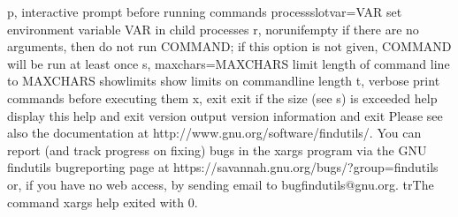 \documentclass[letterpaper,12pt,english]{sphinxmanual}
\begin{document}
\begin{sphinxVerbatim}[commandchars=\\\{\}]
  \PYGZhy{}p, \PYGZhy{}\PYGZhy{}interactive            prompt before running commands
      \PYGZhy{}\PYGZhy{}process\PYGZhy{}slot\PYGZhy{}var=VAR   set environment variable VAR in child processes
  \PYGZhy{}r, \PYGZhy{}\PYGZhy{}no\PYGZhy{}run\PYGZhy{}if\PYGZhy{}empty        if there are no arguments, then do not run COMMAND;
                                 if this option is not given, COMMAND will be
                                 run at least once
  \PYGZhy{}s, \PYGZhy{}\PYGZhy{}max\PYGZhy{}chars=MAX\PYGZhy{}CHARS    limit length of command line to MAX\PYGZhy{}CHARS
      \PYGZhy{}\PYGZhy{}show\PYGZhy{}limits            show limits on command\PYGZhy{}line length
  \PYGZhy{}t, \PYGZhy{}\PYGZhy{}verbose                print commands before executing them
  \PYGZhy{}x, \PYGZhy{}\PYGZhy{}exit                   exit if the size (see \PYGZhy{}s) is exceeded
      \PYGZhy{}\PYGZhy{}help                   display this help and exit
      \PYGZhy{}\PYGZhy{}version                output version information and exit
Please see also the documentation at http://www.gnu.org/software/findutils/.
You can report (and track progress on fixing) bugs in the \PYGZdq{}xargs\PYGZdq{}
program via the GNU findutils bug\PYGZhy{}reporting page at
https://savannah.gnu.org/bugs/?group=findutils or, if
you have no web access, by sending email to \PYGZlt{}bug\PYGZhy{}findutils@gnu.org\PYGZgt{}.
trThe command \PYGZdq{}xargs \PYGZhy{}\PYGZhy{}help\PYGZdq{} exited with 0.
\end{sphinxVerbatim}
\end{document}
